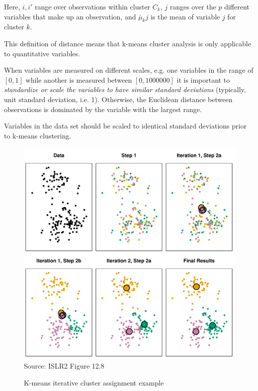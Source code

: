 \noindent Here, $i, i'$ range over observations within cluster $C_k$, $j$ ranges over the $p$ different variables that make up an observation, and $\bar{\mu}_kj$ is the mean of variable $j$ for cluster $k$.

\begin{tcolorbox}[colback=alert]
\noindent This definition of distance means that k-means cluster analysis is only applicable to quantitative variables. 
\end{tcolorbox}

When variables are measured on different scales, e.g. one variables in the range of $[0, 1]$ while another is measured between $[0, 1000000]$ it is important to \emph{standardize or scale the variables to have similar standard deviations} (typically, unit standard deviation, i.e. 1). Otherwise, the Euclidean distance between observations is dominated by the variable with the largest range.

\begin{tcolorbox}[colback=alert]
Variables in the data set should be scaled to identical standard deviations prior to k-means clustering.
\end{tcolorbox}

\begin{figure}
\centering
\includegraphics[width=.75\textwidth]{../class11/Figures_Chapters_7-13/Chapter12/12_8.pdf} \\

\scriptsize Source: ISLR2 Figure 12.8
\caption{K-means iterative cluster assignment example}
\label{fig:kmeans1}
\end{figure}

